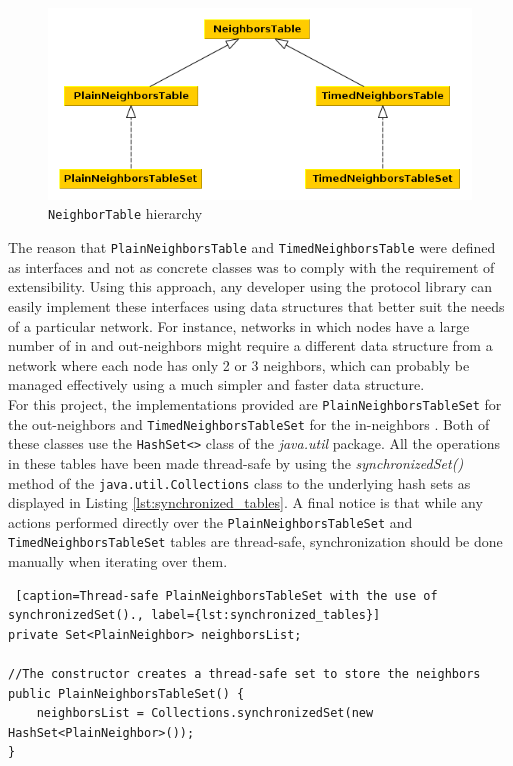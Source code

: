 \documentclass[a4paper,11pt,twoside]{report}
\newcommand{\classname}[1]{\texttt{#1}}
\begin{document}
\begin{figure}
   \centering
     \includegraphics[scale=0.5]{../figures/neighbors_table.png}
	 \caption{\classname{NeighborTable} hierarchy}
     \label{fig:neighbors_tables}
\end{figure}

The reason that \classname{PlainNeighborsTable} and \classname{TimedNeighborsTable} were defined as interfaces and not as concrete classes was to comply with the requirement of extensibility. Using this approach, any developer using the protocol library can easily implement these interfaces using data structures that better suit the needs of a particular network. For instance, networks in which nodes have a large number of in and out-neighbors might require a different data structure from a network where each node has only 2 or 3 neighbors, which can probably be managed effectively using a much simpler and faster data structure.\\

For this project, the implementations provided are \classname{PlainNeighborsTableSet} for the out-neighbors  and \classname{TimedNeighborsTableSet} for the in-neighbors . Both of these classes use the \classname{HashSet<>} class of the \textit{java.util} package. All the operations in these tables have been made thread-safe by using the \textit{synchronizedSet()} method of the \classname{java.util.Collections} class to the underlying hash sets as displayed in Listing \ref{lst:synchronized_tables}. A final notice is that while any actions performed directly over the  
\classname{PlainNeighborsTableSet} and \classname{TimedNeighborsTableSet} tables are thread-safe, synchronization should be done manually when iterating over them.\\

\begin{lstlisting} [caption=Thread-safe PlainNeighborsTableSet with the use of synchronizedSet()., label={lst:synchronized_tables}]
private Set<PlainNeighbor> neighborsList;

//The constructor creates a thread-safe set to store the neighbors	
public PlainNeighborsTableSet() {
	neighborsList = Collections.synchronizedSet(new HashSet<PlainNeighbor>());
}
\end{lstlisting}
\end{document}
